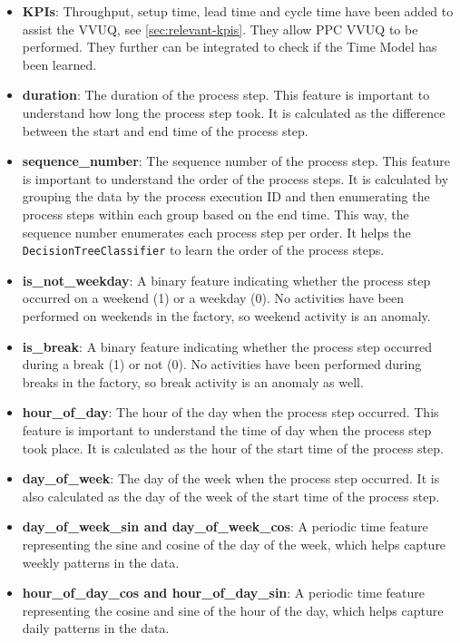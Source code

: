 \begin{itemize}
    \item \textbf{KPIs}: Throughput, setup time, lead time and cycle time have been added to assist the VVUQ, see \autoref{sec:relevant-kpis}. They allow PPC VVUQ to be performed. They further can be integrated to check if the Time Model has been learned.
    \item \textbf{duration}: The duration of the process step. This feature is important to understand how long the process step took. It is calculated as the difference between the start and end time of the process step.
    \item \textbf{sequence\_number}: The sequence number of the process step. This feature is important to understand the order of the process steps. It is calculated by grouping the data by the process execution ID and then enumerating the process steps within each group based on the end time. This way, the sequence number enumerates each process step per order. It helps the \texttt{DecisionTreeClassifier} to learn the order of the process steps.
    \item \textbf{is\_not\_weekday}: A binary feature indicating whether the process step occurred on a weekend (1) or a weekday (0). No activities have been performed on weekends in the factory, so weekend activity is an anomaly.
    \item \textbf{is\_break}: A binary feature indicating whether the process step occurred during a break (1) or not (0). No activities have been performed during breaks in the factory, so break activity is an anomaly as well.
    \item \textbf{hour\_of\_day}: The hour of the day when the process step occurred. This feature is important to understand the time of day when the process step took place. It is calculated as the hour of the start time of the process step.
    \item \textbf{day\_of\_week}: The day of the week when the process step occurred. It is also calculated as the day of the week of the start time of the process step.
    \item \textbf{day\_of\_week\_sin and day\_of\_week\_cos}: A periodic time feature representing the sine and cosine of the day of the week, which helps capture weekly patterns in the data.
    \item \textbf{hour\_of\_day\_cos and hour\_of\_day\_sin}: A periodic time feature representing the cosine and sine of the hour of the day, which helps capture daily patterns in the data.
\end{itemize}


